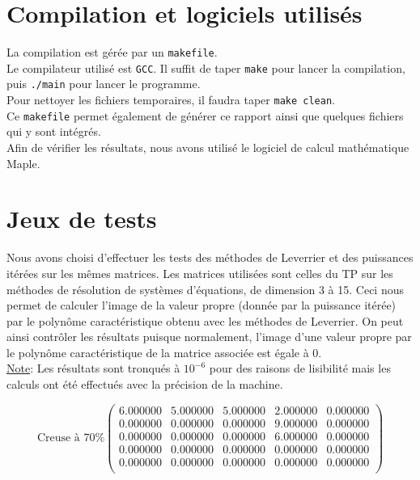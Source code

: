 \documentclass{report}
\begin{document}

\newpage


    \section{Compilation et logiciels utilisés}
      \noindent La compilation est gérée par un \verb"makefile".\\
      Le compilateur utilisé est \verb"GCC".
      Il suffit de taper \verb"make" pour lancer la compilation, puis \verb"./main" pour lancer le programme.\\
      Pour nettoyer les fichiers temporaires, il faudra taper \verb"make clean".\\
      Ce \verb"makefile" permet également de générer ce rapport ainsi que quelques fichiers qui y sont intégrés.\\
      
      Afin de vérifier les résultats, nous avons utilisé le logiciel de calcul mathématique Maple.\\
    \newpage
    \section{Jeux de tests}
      Nous avons choisi d'effectuer les tests des méthodes de Leverrier et des puissances itérées sur les mêmes matrices. Les matrices utilisées sont celles du TP sur les méthodes de résolution de systèmes d'équations, de dimension 3 à 15. Ceci nous permet de calculer l'image de la valeur propre (donnée par la puissance itérée) par le polynôme caractéristique obtenu avec les méthodes de Leverrier. On peut ainsi contrôler les résultats puisque normalement, l'image d'une valeur propre par le polynôme caractéristique de la matrice associée est égale à 0. \\
      
      \underline{Note}: Les résultats sont tronqués à $10^{-6}$ pour des raisons de lisibilité mais les calculs ont été effectués avec la précision de la machine.
      
      \begin{equation}
	\textrm{Creuse à 70\%}
	\begin{pmatrix}
	  6.000000 & 5.000000 & 5.000000 & 2.000000 & 0.000000 \\ 
	  0.000000 & 0.000000 & 0.000000 & 9.000000 & 0.000000 \\ 
	  0.000000 & 0.000000 & 0.000000 & 6.000000 & 0.000000 \\ 
	  0.000000 & 0.000000 & 0.000000 & 0.000000 & 0.000000 \\ 
	  0.000000 & 0.000000 & 0.000000 & 0.000000 & 0.000000 \\ 
	\end{pmatrix}
	\label{syst1}
      \end{equation}
	
\end{document}
